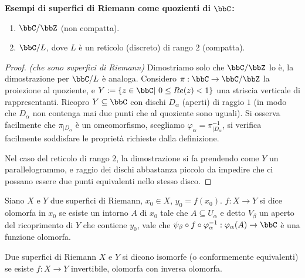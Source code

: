 \textbf{Esempi di superfici di Riemann come quozienti di $\bbC$:}
\begin{enumerate} %
  \item $\bbC/\bbZ$ (non compatta).
  \item $\bbC/L$, dove $L$ è un reticolo (discreto) di rango 2 (compatta).
\end{enumerate}
\begin{proof} \textit{(che sono superfici di Riemann)}
    Dimostriamo solo che $\bbC/\bbZ$ lo è, la dimostrazione per $\bbC/L$ è analoga. Considero $\pi:\bbC\rightarrow\bbC/\bbZ$ la proiezione al quoziente, e $Y:=\{z\in\bbC|\ 0\leq Re(z)<1\}$ una striscia verticale di rappresentanti. Ricopro $Y\subseteq\bbC$ con dischi $D_\alpha$ (aperti) di raggio $1$ (in modo che $D_\alpha$ non contenga mai due punti che al quoziente sono uguali). Si osserva facilmente che $\pi_{|D_\alpha}$ è un omeomorfismo, scegliamo $\varphi_\alpha=\pi_{|D_\alpha}^{-1}$, si verifica facilmente soddisfare le proprietà richieste dalla definizione.

    Nel caso del reticolo di rango $2$, la dimostrazione si fa prendendo come $Y$ un parallelogrammo, e raggio dei dischi abbastanza piccolo da impedire che ci possano essere due punti equivalenti nello stesso disco.
\end{proof}

\begin{definizione}
Siano $X$ e $Y$ due superfici di Riemann, $x_0\in X$, $y_0=f(x_0)$. $f:X\rightarrow Y$ si dice olomorfa in $x_0$ se esiste un intorno $A$ di $x_0$ tale che $A\subseteq U_\alpha$ e detto $V_\beta$ un aperto del ricoprimento di $Y$ che contiene $y_0$, vale che $\psi_\beta \circ f \circ \varphi_\alpha^{-1}: \varphi_\alpha(A)\rightarrow \bbC$ è una funzione olomorfa.
\end{definizione}


\begin{definizione}
Due superfici di Riemann $X$ e $Y$ si dicono isomorfe (o conformemente equivalenti) se esiste $f:X\rightarrow Y$ invertibile, olomorfa con inversa olomorfa.
\end{definizione}


